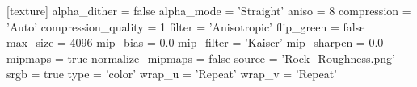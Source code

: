 [texture]
alpha_dither = false
alpha_mode = 'Straight'
aniso = 8
compression = 'Auto'
compression_quality = 1
filter = 'Anisotropic'
flip_green = false
max_size = 4096
mip_bias = 0.0
mip_filter = 'Kaiser'
mip_sharpen = 0.0
mipmaps = true
normalize_mipmaps = false
source = 'Rock_Roughness.png'
srgb = true
type = 'color'
wrap_u = 'Repeat'
wrap_v = 'Repeat'